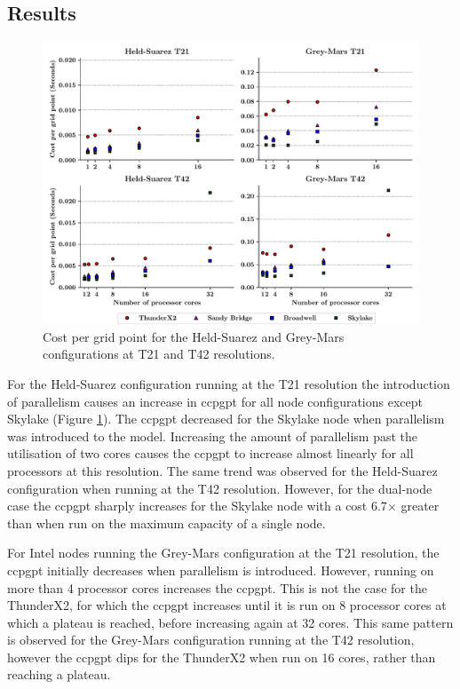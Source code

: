 \documentclass[a4paper,11pt]{report}
\begin{document}
\subsection{Results}
\begin{figure}[htbp]
\begin{center}
\includegraphics[width=1\textwidth]{img/cost-per-grid-point.pdf} 
\caption[Cost per grid point at T21 and T42 resoltuions]{Cost per grid point for the Held-Suarez and Grey-Mars configurations at T21 and T42 resolutions.}
\label{fig:cost-per-grid-point}
\end{center}
\end{figure}
For the Held-Suarez configuration running at the T21 resolution the introduction of parallelism causes an increase in \gls{ccpgpt} for all node configurations except Skylake (Figure \ref{fig:cost-per-grid-point}). The \gls{ccpgpt} decreased for the Skylake node when parallelism was introduced to the model. Increasing the amount of parallelism past the utilisation of two cores causes the \gls{ccpgpt} to increase almost linearly for all processors at this resolution. The same trend was observed for the Held-Suarez configuration when running at the T42 resolution. However, for the dual-node case the \gls{ccpgpt} sharply increases for the Skylake node with a cost 6.7$\times$ greater than when run on the maximum capacity of a single node.
\par
For Intel nodes running the Grey-Mars configuration at the T21 resolution, the \gls{ccpgpt} initially decreases when parallelism is introduced. However, running on more than 4 processor cores increases the \gls{ccpgpt}. This is not the case for the ThunderX2, for which the \gls{ccpgpt} increases until it is run on 8 processor cores at which a plateau is reached, before increasing again at 32 cores. This same pattern is observed for the Grey-Mars configuration running at the T42 resolution, however the \gls{ccpgpt} dips for the ThunderX2 when run on 16 cores, rather than reaching a plateau. 
\end{document}
